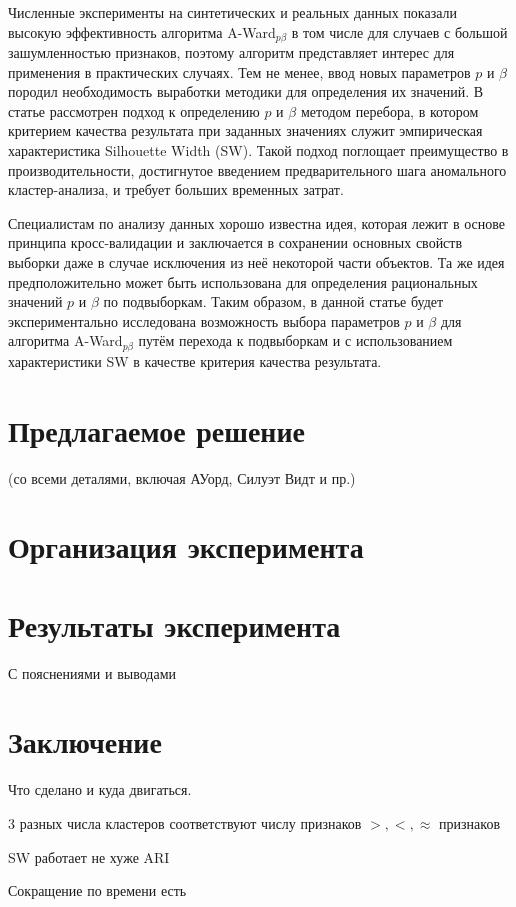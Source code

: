 \documentclass[12pt]{a&t}
\begin{document}
Численные эксперименты на синтетических и реальных данных показали высокую эффективность алгоритма \mbox{A-Ward$ _{p\beta} $} в том числе для случаев с большой зашумленностью признаков, поэтому алгоритм представляет интерес для применения в практических случаях. Тем не менее, ввод новых параметров $ p $ и $ \beta $ породил необходимость выработки методики для определения их значений. В статье \cite{SW-Based-Search} рассмотрен подход к определению $ p $ и $ \beta $ методом перебора, в котором критерием качества результата при заданных значениях служит эмпирическая характеристика Silhouette Width (SW)\cite{SW-Canonical}. Такой подход поглощает преимущество в производительности, достигнутое введением предварительного шага аномального кластер-анализа, и требует больших временных затрат.

Специалистам по анализу данных хорошо известна идея, которая лежит в основе принципа кросс-валидации \cite{None} и заключается в сохранении основных свойств выборки даже в случае исключения из неё некоторой части объектов. Та же идея предположительно может быть использована для определения рациональных значений $ p $ и $ \beta $ по подвыборкам. Таким образом, в данной статье будет экспериментально исследована возможность выбора параметров $ p $ и $ \beta $ для алгоритма \mbox{A-Ward$ _{p\beta} $} путём перехода к подвыборкам и с использованием характеристики SW в качестве критерия качества результата.

\section{Предлагаемое решение}
(со всеми деталями, включая АУорд, Силуэт Видт и пр.)


\section{Организация эксперимента}

\section{Результаты эксперимента}
С пояснениями и выводами

\section{Заключение}

Что сделано и куда двигаться.
\begin{enumlist} %
	\item
	3 разных числа кластеров соответствуют числу признаков $ >,<,\approx $ признаков	
	\item
	SW работает не хуже ARI
	\item
	Сокращение по времени есть
\end{enumlist}
\end{document}
